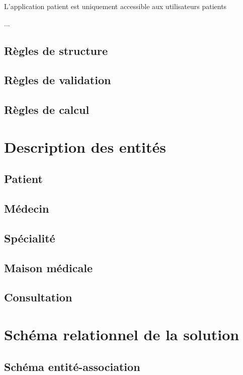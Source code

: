 \documentclass[a4paper,11pt]{article}
\begin{document}
	L'application patient est uniquement accessible aux utilisateurs patients
	
	...
	
	\subsection{Règles de structure}
	
	\subsection{Règles de validation}
	
	\subsection{Règles de calcul}
	
	\newpage
	
	\section{Description des entités}
	
	\subsection{Patient}
	
	\subsection{Médecin}
	
	\subsection{Spécialité}
	
	\subsection{Maison médicale}
	
	\subsection{Consultation}
	
	\newpage
	
	\section{Schéma relationnel de la solution}
	
	\subsection{Schéma entité-association}
	
\end{document}
